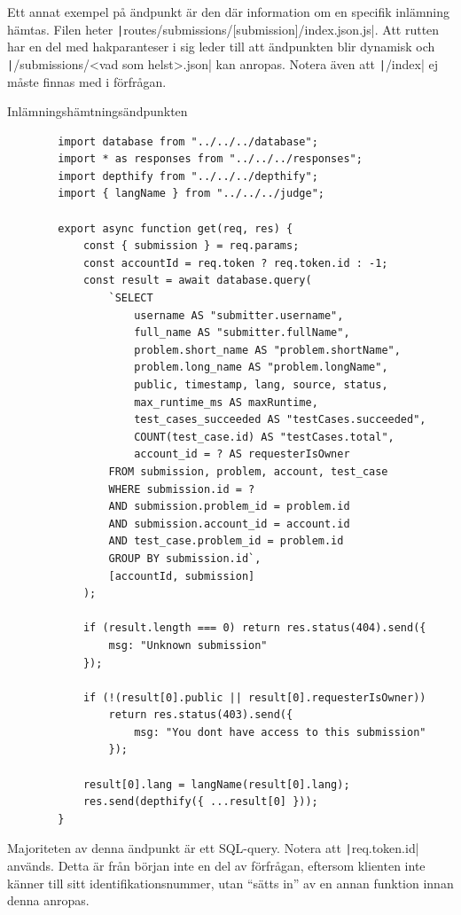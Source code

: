 \documentclass{article}
\begin{document}
Ett annat exempel på ändpunkt är den där information om en specifik inlämning
hämtas. Filen heter \texttt|routes/submissions/[submission]/index.json.js|. Att
rutten har en del med hakparanteser i sig leder till att ändpunkten blir
dynamisk och \texttt|/submissions/<vad som helst>.json| kan anropas. Notera även
att \texttt|/index| ej måste finnas med i förfrågan.

\begin{listing}[H]
	\caption{Inlämningshämtningsändpunkten}
	\begin{verbatim}
		import database from "../../../database";
		import * as responses from "../../../responses";
		import depthify from "../../../depthify";
		import { langName } from "../../../judge";

		export async function get(req, res) {
			const { submission } = req.params;
			const accountId = req.token ? req.token.id : -1;
			const result = await database.query(
				`SELECT
					username AS "submitter.username",
					full_name AS "submitter.fullName",
					problem.short_name AS "problem.shortName",
					problem.long_name AS "problem.longName",
					public, timestamp, lang, source, status,
					max_runtime_ms AS maxRuntime,
					test_cases_succeeded AS "testCases.succeeded",
					COUNT(test_case.id) AS "testCases.total",
					account_id = ? AS requesterIsOwner
				FROM submission, problem, account, test_case
				WHERE submission.id = ?
				AND submission.problem_id = problem.id
				AND submission.account_id = account.id
				AND test_case.problem_id = problem.id
				GROUP BY submission.id`,
				[accountId, submission]
			);

			if (result.length === 0) return res.status(404).send({
				msg: "Unknown submission"
			});

			if (!(result[0].public || result[0].requesterIsOwner))
				return res.status(403).send({
					msg: "You dont have access to this submission"
				});

			result[0].lang = langName(result[0].lang);
			res.send(depthify({ ...result[0] }));
		}
	\end{verbatim}
\end{listing}

Majoriteten av denna ändpunkt är ett SQL-query. Notera att
\texttt|req.token.id| används. Detta är från början inte
en del av förfrågan, eftersom klienten inte känner till sitt
identifikationsnummer, utan ``sätts in'' av en annan funktion innan denna
anropas.
\end{document}
